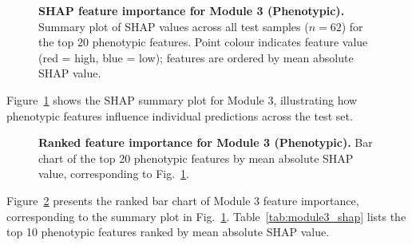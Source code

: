 \documentclass[10pt,letterpaper]{article}
\begin{document}
\begin{figure}[!h]
\caption{\textbf{SHAP feature importance for Module 3 (Phenotypic).} Summary plot of SHAP values across all test samples ($n=62$) for the top 20 phenotypic features. Point colour indicates feature value (red = high, blue = low); features are ordered by mean absolute SHAP value.}
\label{fig:module3_shap_summary}
\end{figure}

Figure~\ref{fig:module3_shap_summary} shows the SHAP summary plot for Module 3, illustrating how phenotypic features influence individual predictions across the test set.

\begin{figure}[!h]
\caption{\textbf{Ranked feature importance for Module 3 (Phenotypic).} Bar chart of the top 20 phenotypic features by mean absolute SHAP value, corresponding to Fig.~\ref{fig:module3_shap_summary}.}
\label{fig:module3_bar}
\end{figure}

Figure~\ref{fig:module3_bar} presents the ranked bar chart of Module 3 feature importance, corresponding to the summary plot in Fig.~\ref{fig:module3_shap_summary}. Table~\ref{tab:module3_shap} lists the top 10 phenotypic features ranked by mean absolute SHAP value.
\end{document}
